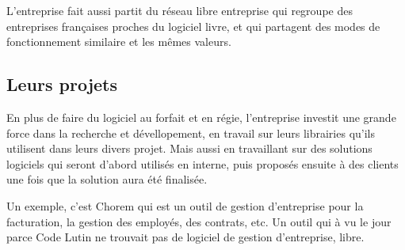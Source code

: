 L'entreprise fait aussi partit du réseau libre entreprise qui regroupe des
entreprises françaises proches du logiciel livre, et qui partagent des modes de
fonctionnement similaire et les mêmes valeurs.



\subsection{Leurs projets}

En plus de faire du logiciel au forfait et en régie, l'entreprise investit une
grande force dans la recherche et dévellopement, en travail sur leurs librairies
qu'ils utilisent dans leurs divers projet. Mais aussi en travaillant sur des
solutions logiciels qui seront d'abord utilisés en interne, puis proposés
ensuite à des clients une fois que la solution aura été finalisée.

Un exemple, c'est Chorem qui est un outil de gestion d'entreprise pour la
facturation, la gestion des employés, des contrats, etc. Un outil qui à vu le
jour parce Code Lutin ne trouvait pas de logiciel de gestion d'entreprise,
libre.

